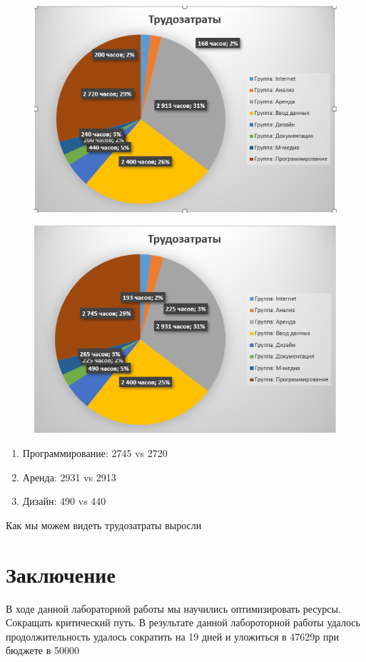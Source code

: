 \begin{figure}[H]
	\centering
	\includegraphics[width=0.7\linewidth]{src/lab3_3_2}
	\caption{}
	\label{fig:lab332}
\end{figure}

\begin{figure}[H]
	\centering
	\includegraphics[width=0.7\linewidth]{src/lab3_3_3}
	\caption{}
	\label{fig:lab333}
\end{figure}

\begin{enumerate}
	\item Программирование: 2745 vs 2720
	\item Аренда: 2931 vs 2913
	\item Дизайн: 490 vs 440
\end{enumerate}

Как мы можем видеть трудозатраты выросли

\section{Заключение}
В ходе данной лабораторной работы мы научились оптимизировать ресурсы. Сокращать критический путь.
В результате данной лабороторной работы удалось продолжительность удалось сократить на 19 дней и уложиться в 47629р при бюджете в 50000


















